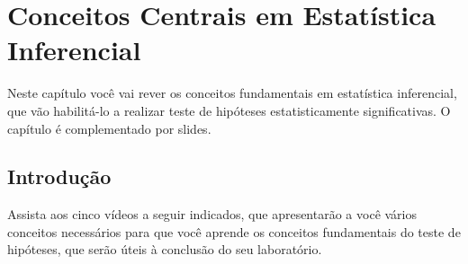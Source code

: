 \chapter{Conceitos Centrais em Estatística Inferencial}

Neste capítulo você vai rever os conceitos fundamentais em estatística inferencial, que vão habilitá-lo a realizar teste de hipóteses estatisticamente significativas.
O capítulo é complementado por slides.

\section{Introdução}

Assista aos cinco vídeos a seguir indicados, que apresentarão a você vários conceitos necessários para que você aprende os conceitos fundamentais do teste de hipóteses, que serão úteis à conclusão do seu laboratório.

